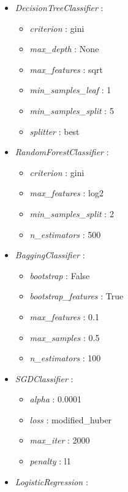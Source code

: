 \documentclass{article}
\begin{document}
\begin{small}
\begin{multicols}{2}
\begin{itemize}
    \item \textit{DecisionTreeClassifier} :
    \begin{itemize}
        \item \textit{criterion} : gini
        \item \textit{max\_depth} : None
        \item \textit{max\_features} : sqrt
        \item \textit{min\_samples\_leaf} : 1
        \item \textit{min\_samples\_split} : 5
        \item \textit{splitter} : best
    \end{itemize}
    \item \textit{RandomForestClassifier} :
    \begin{itemize}
        \item \textit{criterion} : gini
        \item \textit{max\_features} : log2
        \item \textit{min\_samples\_split} : 2
        \item \textit{n\_estimators} : 500
    \end{itemize}
    \item \textit{BaggingClassifier} :
    \begin{itemize}
        \item \textit{bootstrap} : False
        \item \textit{bootstrap\_features} : True
        \item \textit{max\_features} : 0.1
        \item \textit{max\_samples} : 0.5
        \item \textit{n\_estimators} : 100
    \end{itemize}
    \item \textit{SGDClassifier} :
    \begin{itemize}
        \item \textit{alpha} : 0.0001
        \item \textit{loss} : modified\_huber
        \item \textit{max\_iter} : 2000
        \item \textit{penalty} : l1
    \end{itemize}
    \item \textit{LogisticRegression} :

\end{itemize}
\end{multicols}
\end{small}
\end{document}
